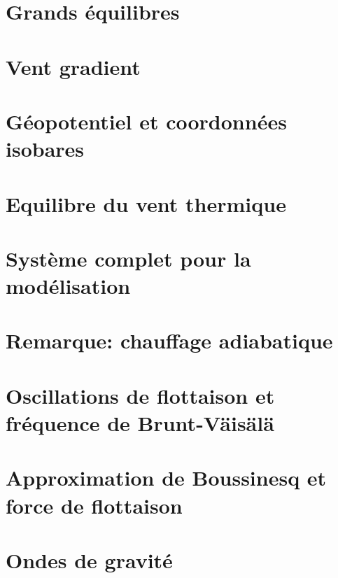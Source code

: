 \documentclass[a4paper,DIV16,10pt]{scrartcl}
\begin{document}
 \inidoc

\newpage
\section{Grands équilibres}


\newpage
\section{Vent gradient}


\newpage
\section{Géopotentiel et coordonnées isobares}


\newpage
\section{Equilibre du vent thermique}



\newpage
\section{Système complet pour la modélisation}

\section{Remarque: chauffage adiabatique}


\newpage
\section{Oscillations de flottaison et fréquence de Brunt-V{\"a}is{\"a}l{\"a}}


\newpage
\section{Approximation de Boussinesq et force de flottaison}


\newpage
\section{Ondes de gravité}

\end{document}
